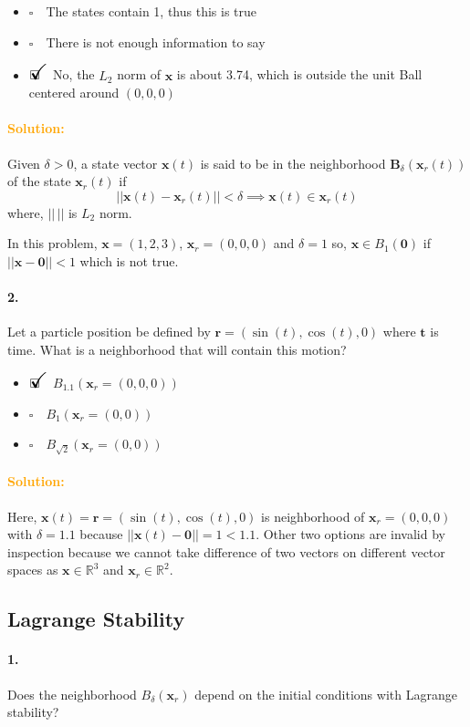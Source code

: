 \documentclass[12pt, a4paper]{article}
\newcommand{\ans}{\item[]$\rlap{\LARGE{\checkmark}}\square\quad$}
\newcommand{\noans}{\item[]$\square\quad$}
\begin{document}
\begin{itemize}
\noans The states contain 1, thus this is true
\noans There is not enough information to say
\ans No, the $L_{2}$ norm of $\bm{x}$ is about 3.74, which is outside the unit Ball centered around $(0,0,0)$
\end{itemize}

\paragraph{\textcolor{orange}{Solution:}}
Given $\delta > 0$, a state vector $\bm{x}(t)$ is said to be in the neighborhood $\bm{B}_{\delta}(\bm{x}_{r}(t))$ of the state $\bm{x}_{r}(t)$ if
$$|\!|\bm{x}(t) - \bm{x}_{r}(t)|\!| < \delta \implies \bm{x}(t) \in \bm{x}_{r}(t)$$
where, $|\!|\,|\!|$ is $L_{2}$ norm. \medskip

In this problem, $\bm{x}=(1,2,3)$, $\bm{x}_{r} = (0,0,0)$ and $\delta = 1$ so, $\bm{x} \in B_{1}(\bm{0})$ if $|\!|\bm{x} - \bm{0}|\!| < 1$ which is not true.

\paragraph{2.}
Let a particle position be defined by $\bm{r} = (\sin(t), \cos(t), 0)$ where $\bm{t}$ is time. What is a neighborhood that will contain this motion?

\begin{itemize}
\ans $B_{1.1}(\bm{x}_{r} = (0,0,0))$
\noans $B_{1}(\bm{x}_{r} = (0,0))$
\noans $B_{\sqrt{2}}(\bm{x}_{r} = (0,0))$
\end{itemize}

\paragraph{\textcolor{orange}{Solution:}}
Here, $\bm{x}(t) = \bm{r} = (\sin(t), \cos(t), 0)$ is neighborhood of $\bm{x}_{r} =(0,0,0)$ with $\delta = 1.1$ because $|\!|\bm{x}(t) - \bm{0}|\!| = 1 < 1.1$. Other two options are invalid by inspection because we cannot take difference of two vectors on different vector spaces as $\bm{x} \in \mathbb{R}^{3}$ and $\bm{x}_{r} \in \mathbb{R}^{2}$.

\newpage
\subsection{Lagrange Stability}
\paragraph{1.}
Does the neighborhood $B_{\delta}(\bm{x}_{r})$ depend on the initial conditions with Lagrange stability?
\end{document}
